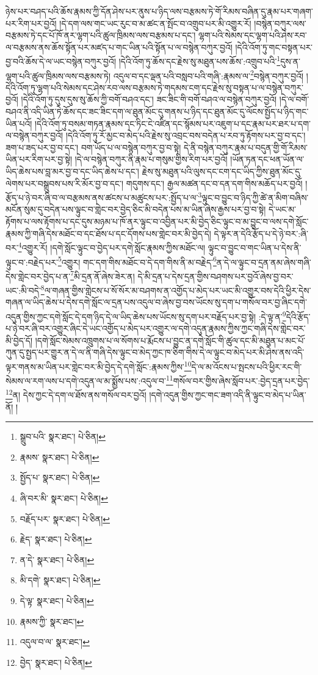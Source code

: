 ཉེས་པར་བཤད་པའི་ཆོས་རྣམས་ཀྱི་དོན་ཤེས་པར་ནུས་པ་ཉིད་ལས་བརྩམས་ཏེ་གོ་རིམས་བཞིན་དུ་རྣམ་པར་གཞག་པར་རིག་པར་བྱའོ། །དེ་དག་ལས་གང་ཡང་རུང་བ་མ་ཚང་ན་སྤོང་བ་འགྲུབ་པར་མི་འགྱུར་རོ། །བསྙེན་བཀུར་ལས་བརྩམས་ཏེ་དང་པོ་ཁོ་ནར་ལྷག་པའི་ཚུལ་ཁྲིམས་ལས་བརྩམས་པ་དང་། ལྷག་པའི་སེམས་དང་ལྷག་པའི་ཤེས་རབ་ལ་བརྩམས་ནས་ཆོས་སྟོན་པར་མཛད་པ་གང་ཡིན་པའི་སྟོན་པ་ལ་བསྙེན་བཀུར་བྱའོ། །དེའི་འོག་ཏུ་གང་བསྟན་པར་བྱ་བའི་ཆོས་དེ་ལ་ཡང་བསྙེན་བཀུར་བྱའོ། །དེའི་འོག་ཏུ་ཆོས་དང་རྗེས་སུ་མཐུན་པས་ཆོས་:འགྲུབ་པའི་\footnote{སྒྲུབ་པའི་  སྣར་ཐང་།  པེ་ཅིན། }དུས་ན་ལྷག་པའི་ཚུལ་ཁྲིམས་ལས་བརྩམས་ཏེ། འདུལ་བ་དང་ལྡན་པའི་བསླབ་པའི་གཞི་:རྣམས་ལ་\footnote{རྣམས་  སྣར་ཐང་།  པེ་ཅིན། }བསྙེན་བཀུར་བྱའོ། །དེའི་འོག་ཏུ་ལྷག་པའི་སེམས་དང་ཤེས་རབ་ལས་བརྩམས་ཏེ་གདམས་ངག་དང་རྗེས་སུ་བསྟན་པ་ལ་བསྙེན་བཀུར་བྱའོ། །དེའི་འོག་ཏུ་དུས་དུས་སུ་ཆོས་ཀྱི་བགོ་བཤའ་དང་། ཟང་ཟིང་གི་བགོ་བཤའ་ལ་བསྙེན་བཀུར་བྱའོ། །དེ་ལ་བགོ་བཤའ་ནི་འདི་ཡིན་ཏེ་ཆོས་དང་ཟང་ཟིང་དག་ལ་ཐུན་མོང་དུ་གནས་པ་ཉིད་དང་ཐུན་མོང་དུ་ལོངས་སྤྱོད་པ་ཉིད་གང་ཡིན་པའོ། །དེའི་འོག་ཏུ་བསམ་གཏན་རྣམས་དང་ཏིང་ངེ་འཛིན་དང་སྙོམས་པར་འཇུག་པ་དང་རྣམ་པར་ཐར་པ་དག་ལ་བསྙེན་བཀུར་བྱའོ། །དེའི་འོག་ཏུ་རོ་མྱང་བ་མེད་པའི་རྗེས་སུ་འབྲང་བས་བདེན་པ་རབ་ཏུ་རྟོགས་པར་བྱ་བ་དང་། ཟག་པ་ཟད་པར་བྱ་བ་དང་། བག་ཡོད་པ་ལ་བསྙེན་བཀུར་བྱ་བ་སྟེ། དེ་ནི་བསྙེན་བཀུར་རྣམ་པ་བདུན་གྱི་གོ་རིམས་ཡིན་པར་རིག་པར་བྱ་སྟེ། །དེ་ལ་བསྙེན་བཀུར་ནི་རྣམ་པ་གསུམ་གྱིས་རིག་པར་བྱའོ། །ཡོན་ཏན་དང་ཕན་ཡོན་ལ་ཡིད་ཆེས་པས་བླ་མར་བྱ་བ་དང་ཡིད་ཆེས་པ་དང་། རྗེས་སུ་མཐུན་པའི་ལུས་དང་ངག་དང་ཡིད་ཀྱིས་ཐུན་མོང་དུ་ལེགས་པར་བསྒྲུབས་པས་རི་མོར་བྱ་བ་དང་། གདུགས་དང་། རྒྱལ་མཚན་དང་བ་དན་དག་གིས་མཆོད་པར་བྱའོ། །རྩོད་པ་ཉེ་བར་ཞི་བ་ལ་བརྩམས་ནས་ཚངས་པ་མཚུངས་པར་:སྤྱོད་པ་ལ་\footnote{སྤྱོད་པ་  སྣར་ཐང་།  པེ་ཅིན། }ལྟུང་བ་བྱུང་བ་ཉིད་ཀྱི་ཚེ་ན་མིག་བཞིས་མངོན་སུམ་དུ་བདེན་པས་ལྟུང་བ་གླེང་བར་བྱེད་ཅིང་མི་བདེན་པས་མ་ཡིན་ཞེས་རྒྱས་པར་བྱ་བ་སྟེ། དེ་ཡང་མ་རྟོགས་པ་ལས་རྟོགས་པ་དང་དུས་མཉམ་པ་ཁོ་ནར་ལྟུང་བ་འབྱིན་པར་མི་བྱེད་ཅིང་ལྟུང་བ་མ་བྱུང་བ་ལས་དགེ་སློང་རྣམས་ཀྱི་གཞི་དེས་མཐོང་བ་དང་ཐོས་པ་དང་དོགས་པས་གླེང་བར་མི་བྱེད་དེ། དེ་ལྟར་ན་དེའི་རྩོད་པ་དེ་ཉེ་བར་:ཞི་བར་\footnote{ཞི་བར་མི་  སྣར་ཐང་།  པེ་ཅིན། }འགྱུར་རོ། །དགེ་སློང་ལྟུང་བ་བྱེད་པར་དགེ་སློང་རྣམས་ཀྱིས་མཐོང་ལ། ལྟུང་བ་བྱུང་བ་གང་ཡིན་པ་དེས་ནི་ལྟུང་བ་:བརྗེད་པར་\footnote{བརྗོད་པར་  སྣར་ཐང་།  པེ་ཅིན། }འགྱུར། གང་དག་གིས་མཐོང་བ་དེ་དག་གིས་ནི་མ་བརྗེད་\footnote{རྗེད་  སྣར་ཐང་།  པེ་ཅིན། }ན་དེ་ལ་ལྟུང་བ་དྲན་ནམ་ཞེས་གཞི་དེས་གླེང་བར་བྱེད་པ་ན་\footnote{ན་དེ་  སྣར་ཐང་།  པེ་ཅིན། }མི་དྲན་ནོ་ཞེས་ཟེར་ན། དེ་མི་དྲན་པ་དེས་དྲན་གྱིས་བཤགས་པར་བྱའོ་ཞེས་བྱ་བར་ཡང་:མི་བདེ་\footnote{མི་དགེ་  སྣར་ཐང་།  པེ་ཅིན། }ལ་གཞན་གྱིས་གླེངས་པ་སོ་སོར་མ་བཤགས་ན་འགྱོད་པ་མེད་པར་ཡང་མི་འགྱུར་བས་དེའི་ཕྱིར་དེས་གཞན་ལ་ཡིད་ཆེས་པ་དེས་དགེ་སློང་ལ་དྲན་པས་འདུལ་བ་ཞེས་བྱ་བས་ཡོངས་སུ་དག་པ་གསོལ་བར་བྱ་ཞིང་དགེ་འདུན་གྱིས་ཀྱང་དགེ་སློང་དེ་དག་ཉིད་དེ་ལ་ཡིད་ཆེས་པས་ཡོངས་སུ་དག་པར་བརྗོད་པར་བྱ་སྟེ། :དེ་ལྟ་ན་\footnote{དེ་ལྟ་  སྣར་ཐང་།  པེ་ཅིན། }དེའི་རྩོད་པ་ཉེ་བར་ཞི་བར་འགྱུར་ཞིང་དེ་ཡང་འགྱོད་པ་མེད་པར་འགྱུར་ལ་དགེ་འདུན་རྣམས་ཀྱིས་ཀྱང་གཞི་དེས་གླེང་བར་མི་བྱེད་དོ། །དགེ་སློང་སེམས་འཁྲུགས་པ་ལ་སོགས་པ་རྨོངས་པ་བྱུང་ན་དགེ་སློང་གི་ཚུལ་དང་མི་མཐུན་པ་མང་པོ་ཀུན་དུ་སྤྱད་པར་གྱུར་ན་དེ་ལ་ནི་གཞི་དེས་ལྟུང་བ་མེད་ཀྱང་ཁ་ཅིག་གིས་དེ་ལ་ལྟུང་བ་མེད་པར་མི་ཤེས་ནས་འདི་ལྟར་གནས་མ་ཡིན་པར་གླེང་བར་མི་བྱེད་དེ་དགེ་སློང་:རྣམས་ཀྱིས་\footnote{རྣམས་ཀྱི་  སྣར་ཐང་། }དེ་ལ་མ་འོངས་པ་སྤངས་པའི་ཕྱིར་རང་གི་སེམས་ལ་རག་ལས་པ་དགེ་འདུན་ལ་མ་སྨྱོས་པས་:འདུལ་བ་\footnote{འདུལ་བ་ལ་  སྣར་ཐང་། }གསོལ་བར་གྱིས་ཞེས་སློབ་པར་:བྱེད་དྲན་པར་བྱེད་\footnote{བྱེད་  སྣར་ཐང་།  པེ་ཅིན། }ན། དེས་ཀྱང་དེ་དག་ལ་ཐོས་ནས་གསོལ་བར་བྱའོ། །དགེ་འདུན་གྱིས་ཀྱང་གང་ཟག་འདི་ནི་ལྟུང་བ་མེད་པ་ཡིན་ནོ། །
